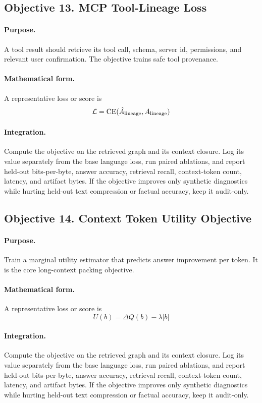 \documentclass[11pt]{article}
\theoremstyle{definition}
\theoremstyle{remark}
\begin{document}
\subsection{Objective 13. MCP Tool-Lineage Loss}
\paragraph{Purpose.} A tool result should retrieve its tool call, schema, server id, permissions, and relevant user confirmation. The objective trains safe tool provenance.

\paragraph{Mathematical form.} A representative loss or score is
\[
    \mathcal L=\operatorname{CE}(\hat A_{\rm lineage},A_{\rm lineage})
\]

\paragraph{Integration.} Compute the objective on the retrieved graph and its context closure. Log its value separately from the base language loss, run paired ablations, and report held-out bits-per-byte, answer accuracy, retrieval recall, context-token count, latency, and artifact bytes. If the objective improves only synthetic diagnostics while hurting held-out text compression or factual accuracy, keep it audit-only.


\subsection{Objective 14. Context Token Utility Objective}
\paragraph{Purpose.} Train a marginal utility estimator that predicts answer improvement per token. It is the core long-context packing objective.

\paragraph{Mathematical form.} A representative loss or score is
\[
    U(b)=\Delta Q(b)-\lambda |b|
\]

\paragraph{Integration.} Compute the objective on the retrieved graph and its context closure. Log its value separately from the base language loss, run paired ablations, and report held-out bits-per-byte, answer accuracy, retrieval recall, context-token count, latency, and artifact bytes. If the objective improves only synthetic diagnostics while hurting held-out text compression or factual accuracy, keep it audit-only.
\end{document}
